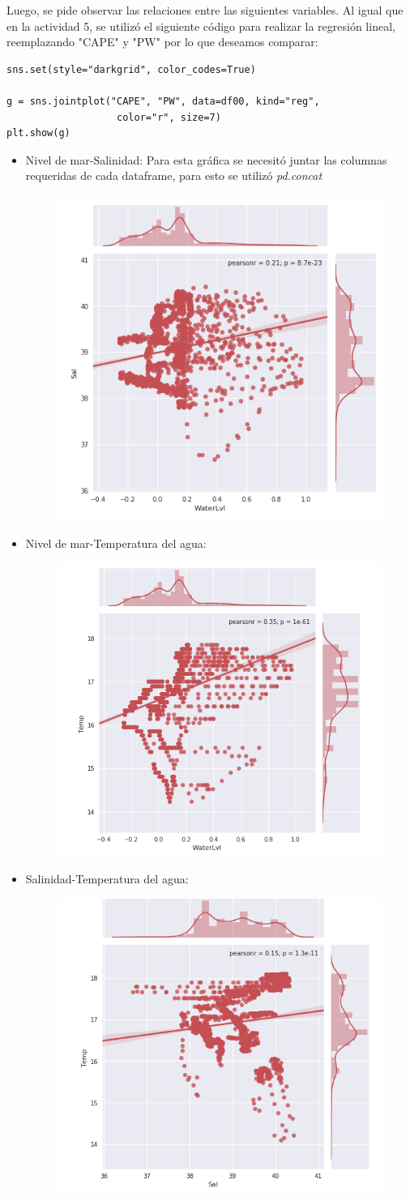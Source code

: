 \documentclass{article}
\begin{document}
Luego, se pide observar las relaciones entre las siguientes variables.
Al igual que en la actividad 5, se utilizó el siguiente código para realizar la regresión lineal, reemplazando "CAPE" y "PW" por lo que deseamos comparar:
\begin{verbatim}
sns.set(style="darkgrid", color_codes=True)

g = sns.jointplot("CAPE", "PW", data=df00, kind="reg",
                   color="r", size=7)
plt.show(g)
\end{verbatim}

\begin{itemize}
\item Nivel de mar-Salinidad:
Para esta gráfica se necesitó juntar las columnas requeridas de cada dataframe, para esto se utilizó \textit{pd.concat}
\begin{figure}[ht!]
\centering
\includegraphics[width=0.4\linewidth]{nivel-salinidad.png}
\end{figure}

\item Nivel de mar-Temperatura del agua:
\begin{figure}[ht!]
\centering
\includegraphics[width=0.4\linewidth]{nivel-temp.png}
\end{figure}

\item Salinidad-Temperatura del agua:
\begin{figure}[ht!]
\centering
\includegraphics[width=0.4\linewidth]{sal-temp.png}
\end{figure}

\end{itemize}
\end{document}
